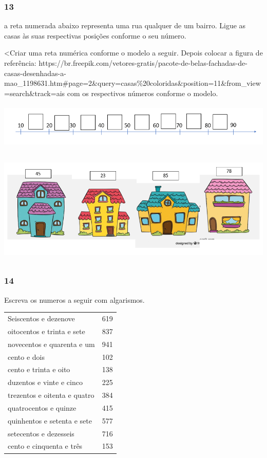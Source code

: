 \subsubsection{13 }\label{section-1}

a reta numerada abaixo representa uma rua qualquer de um bairro. Ligue
as casas às suas respectivas posições conforme o seu número.

\textless{}Criar uma reta numérica conforme o modelo a seguir. Depois
colocar a figura de referência:
https://br.freepik.com/vetores-gratis/pacote-de-belas-fachadas-de-casas-desenhadas-a-mao\_1198631.htm\#page=2\&query=casas\%20coloridas\&position=11\&from\_view=search\&track=ais
com os respectivos números conforme o modelo.

\includegraphics[width=5.90556in,height=0.83681in]{media/image10.png}

\includegraphics[width=5.90556in,height=2.10972in]{media/image11.png}

\subsubsection{14}\label{section-2}

Escreva os numeros a seguir com algarismos.

\begin{longtable}[]{@{}ll@{}}
\toprule
Seiscentos e dezenove & 619\tabularnewline
oitocentos e trinta e sete & 837\tabularnewline
novecentos e quarenta e um & 941\tabularnewline
cento e dois & 102\tabularnewline
cento e trinta e oito & 138\tabularnewline
duzentos e vinte e cinco & 225\tabularnewline
trezentos e oitenta e quatro & 384\tabularnewline
quatrocentos e quinze & 415\tabularnewline
quinhentos e setenta e sete & 577\tabularnewline
setecentos e dezesseis & 716\tabularnewline
cento e cinquenta e três & 153\tabularnewline
\bottomrule
\end{longtable}

